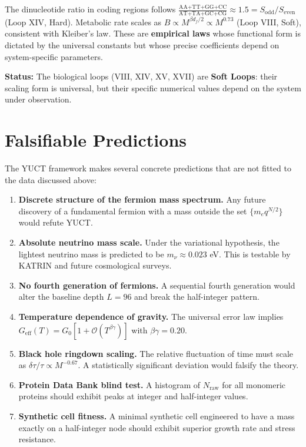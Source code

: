 \documentclass[12pt,a4paper]{article}
\begin{document}
	The dinucleotide ratio in coding regions follows \(\frac{\text{AA+TT+GG+CC}}{\text{AT+TA+GC+CG}} \approx 1.5 = S_{\mathrm{odd}}/S_{\mathrm{even}}\) (Loop XIV, Hard). Metabolic rate scales as \(B \propto M^{\beta d_f/2} \propto M^{0.73}\) (Loop VIII, Soft), consistent with Kleiber's law. These are \textbf{empirical laws} whose functional form is dictated by the universal constants but whose precise coefficients depend on system-specific parameters.
	
	\textbf{Status:} The biological loops (VIII, XIV, XV, XVII) are \textbf{Soft Loops}: their scaling form is universal, but their specific numerical values depend on the system under observation.
	
	\section{Falsifiable Predictions}
	\label{sec:predictions}
	
	The YUCT framework makes several concrete predictions that are not fitted to the data discussed above:
	
	\begin{enumerate}
		\item \textbf{Discrete structure of the fermion mass spectrum.} Any future discovery of a fundamental fermion with a mass outside the set \(\{m_e q^{N/2}\}\) would refute YUCT.
		\item \textbf{Absolute neutrino mass scale.} Under the variational hypothesis, the lightest neutrino mass is predicted to be \(m_{\nu} \approx 0.023\) eV. This is testable by KATRIN and future cosmological surveys.
		\item \textbf{No fourth generation of fermions.} A sequential fourth generation would alter the baseline depth \(L = 96\) and break the half-integer pattern.
		\item \textbf{Temperature dependence of gravity.} The universal error law implies \(G_{\mathrm{eff}}(T) = G_0[1 + \mathcal{O}(T^{\beta\gamma})]\) with \(\beta\gamma = 0.20\).
		\item \textbf{Black hole ringdown scaling.} The relative fluctuation of time must scale as \(\delta\tau/\tau \propto M^{-0.67}\). A statistically significant deviation would falsify the theory.
		\item \textbf{Protein Data Bank blind test.} A histogram of \(N_{\mathrm{raw}}\) for all monomeric proteins should exhibit peaks at integer and half-integer values.
		\item \textbf{Synthetic cell fitness.} A minimal synthetic cell engineered to have a mass exactly on a half-integer node should exhibit superior growth rate and stress resistance.
	\end{enumerate}
	
\end{document}

